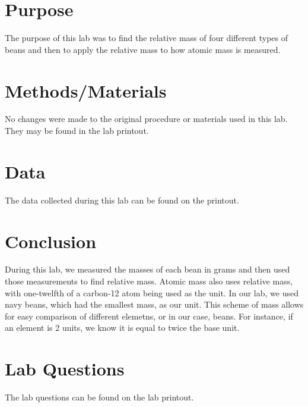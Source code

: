 \documentclass{article}
\begin{document}

\section{Purpose}

	The purpose of this lab was to find the relative mass of four different types of beans and then to apply the relative mass to how atomic mass is measured.

\section{Methods/Materials}

	No changes were made to the original procedure or materials used in this lab. They may be found in the lab printout.

\section{Data}

	The data collected during this lab can be found on the printout.

\section{Conclusion}

	During this lab, we measured the masses of each bean in grams and then used those measurements to find relative mass. Atomic mass also uses relative mass, with one-twelfth of a carbon-12 atom being used as the unit. In our lab, we used navy beans, which had the smallest mass, as our unit. This scheme of mass allows for easy comparison of different elemetns, or in our case, beans. For instance, if an element is 2 units, we know it is equal to twice the base unit.

\section{Lab Questions}

	The lab questions can be found on the lab printout.
\end{document}

